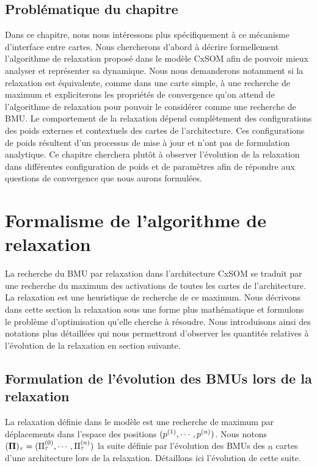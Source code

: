 \documentclass[../main]{subfiles}
\begin{document}
\subsection{Problématique du chapitre}

Dans ce chapitre, nous nous intéressons plus spécifiquement à ce mécanisme d'interface entre cartes.
Nous chercherons d'abord à décrire formellement l'algorithme de relaxation proposé dans le modèle CxSOM afin de pouvoir mieux analyser et représenter sa dynamique. Nous nous demanderons notamment si la relaxation est équivalente, comme dans une carte simple, à une recherche de maximum et expliciterons les propriétés de convergence qu'on attend de l'algorithme de relaxation pour pouvoir le considérer comme une recherche de BMU.
Le comportement de la relaxation dépend complètement des configurations des poids externes et contextuels des cartes de l'architecture. Ces configurations de poids résultent d'un processus de mise à jour et n'ont pas de formulation analytique.
Ce chapitre cherchera plutôt à observer l'évolution de la relaxation dans différentes configuration de poids et de paramètres afin de répondre aux questions de convergence que nous aurons formulées.

\section{Formalisme de l'algorithme de relaxation}

La recherche du BMU par relaxation dans l'architecture CxSOM se traduit par une recherche du maximum des activations de toutes les cartes de l'architecture. La relaxation est une heuristique de recherche de ce maximum.
Nous décrivons dans cette section la relaxation sous une forme plus mathématique et formulons le problème d'optimisation qu'elle cherche à résoudre. Nous introduisons ainsi des notations plus détaillées qui nous permettront d'observer les quantités relatives à l'évolution de la relaxation en section suivante.

\subsection{Formulation de l'évolution des BMUs lors de la relaxation}

La relaxation définie dans le modèle est une recherche de maximum par déplacements dans l'espace des positions $(p^{({1})},\cdots, p^{({n})})$.
Nous notons $(\mathbf{\Pi})_\tau = (\Pi^{({0})}_\tau,\cdots,\Pi^{({n})}_\tau)$ la suite définie par l'évolution des BMUs des $n$ cartes d'une architecture lors de la relaxation.
Détaillons ici l'évolution de cette suite.
\end{document}
